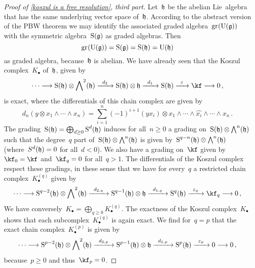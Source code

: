 \begin{proof}[Proof of \cref{koszul is a free resolution}, third part]
  Let~$\mathfrak{h}$ be the abelian Lie~algebra that has the same underlying vector space of~$\mathfrak{h}$.
  According to the abstract version of the PBW theorem we may identify the associated graded algebra~$\gr( \Univ(\glie) )$ with the symmetric algebra~$\operatorname{S}(\mathfrak{g})$ as graded algebras.
  Then
  \[
    \gr(\Univ(\glie))
    =
    \Symm(\glie)
    =
    \Symm(\hlie)
    =
    \Univ(\hlie)
  \]
  as graded algebra, because~$\mathfrak{h}$ is abelian.
  We have already seen that the Koszul complex~$K_\bullet$ of~$\mathfrak{h}$, given by
  \[
    \dotsb
    \to
    \Symm(\hlie) \otimes \Exterior^2(\hlie)
    \xto{d_2}
    \Symm(\hlie) \otimes \hlie
    \xto{d_1}
    \Symm(\hlie)
    \xto{\varepsilon}
    \kf
    \to
    0 \,,
  \]
  is exact, where the differentials of this chain complex are given by
  \[
    d_n( y \otimes x_1 \wedge \dotsb \wedge x_n)
    =
    \sum_{i=1}^n
    (-1)^{i+1} (y x_i) \otimes x_1 \wedge \dotsb \wedge \widehat{x_i} \wedge \dotsb \wedge x_n \,.
  \]
  The grading~$\operatorname{S}(\mathfrak{h}) = \bigoplus_{d \geq 0} \operatorname{S}^d(\mathfrak{h})$ induces for all~$n \geq 0$ a grading on~$\operatorname{S}(\mathfrak{h}) \otimes \operatorname{\bigwedge}^n(\mathfrak{h})$ such that the degree~$q$ part of~$\operatorname{S}(\mathfrak{h}) \otimes \operatorname{\bigwedge}^n(\mathfrak{h})$ is given by~$\operatorname{S}^{q-n}(\mathfrak{h}) \otimes \operatorname{\bigwedge}^n(\mathfrak{h})$ (where~$S^d(\mathfrak{h}) = 0$ for all~$d < 0$).
  We also have a grading on~$\kf$ given by~$\kf_0 = \kf$ and~$\kf_q = 0$ for all~$q > 1$.
  The differentials of the Koszul complex respect these gradings, in these sense that we have for every~$q$ a restricted chain complex~$K^{(q)}_\bullet$ given by
  \[
    \dotsb
    \to
    \Symm^{q-2}(\hlie) \otimes \Exterior^2(\hlie)
    \xto{d_{2,q}}
    \Symm^{q-1}(\hlie) \otimes \hlie
    \xto{d_{1,q}}
    \Symm^q(\hlie)
    \xto{\varepsilon_q}
    \kf_q
    \to
    0 \,,
  \]
  We have conversely~$K_\bullet = \bigoplus_{q \geq 0} K^{(q)}_\bullet$.
  The exactness of the Koszul complex~$K_\bullet$ shows that each subcomplex~$K^{(q)}_\bullet$ is again exact.
  We find for~$q = p$ that the exact chain complex~$K^{(p)}_\bullet$ is given by
  \[
    \dotsb
    \to
    \Symm^{p-2}(\hlie) \otimes \Exterior^2(\hlie)
    \xto{d_{2,p}}
    \Symm^{p-1}(\hlie) \otimes \hlie
    \xto{d_{1,p}}
    \Symm^p(\hlie)
    \xto{\varepsilon_p}
    0
    \to
    0 \,,
  \]
  because~$p \geq 0$ and thus~$\kf_p = 0$.


\end{proof}
